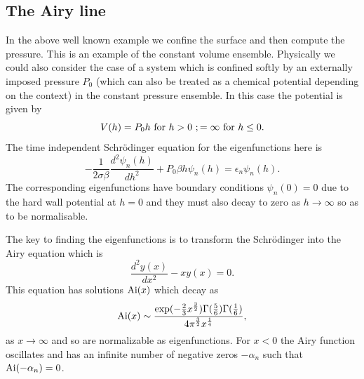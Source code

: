 \subsection{The Airy line}
In the  above well known example we confine the surface and then compute the pressure. This is an example of the constant volume ensemble. Physically we could also consider the case of a system which is confined softly by an externally imposed pressure $P_0$ (which can also be treated as a chemical potential depending on the context) in the constant pressure ensemble. In this case the potential is given by
\begin{equation}
V(h) = P_0 h \ {\rm for }\ h>0\ ; =\infty \ {\rm for}\ h\leq 0. 
\end{equation}
The time independent Schr\"odinger equation for the eigenfunctions here is
\begin{equation}
-\frac{1}{2\sigma\beta}\frac{d^2 \psi_n(h)}{dh^2} + P_0\beta h \psi_n(h) = \epsilon_n\psi_n(h).
\end{equation}
The corresponding eigenfunctions have boundary conditions $\psi_n(0)=0$ due to the hard wall potential at $h=0$ and they must also decay to zero as $h\to \infty$ so as to be normalisable.

The key to finding the eigenfunctions is to transform  the Schr\"odinger into the Airy equation which is
\begin{equation}
\frac{d^2y(x)}{dx^2}- x y(x)=0.
\end{equation}
This equation has solutions ${\rm Ai}(x)$ which decay as 
\begin{equation}
{\rm Ai}(x) \sim \frac{\exp(-\frac{2}{3} x^{\frac{3}{2}}) \Gamma(\frac{5}{6})\Gamma(\frac{1}{6})}{4\pi^{\frac{3}{2}} x^{\frac{1}{4}}},
\end{equation}
as $x\to\infty$ and so are normalizable as eigenfunctions. For $x<0$ the Airy function  oscillates and has an 
infinite number of negative zeros $-\alpha_n$ such that ${\rm Ai}(-\alpha_n)=0$. 

